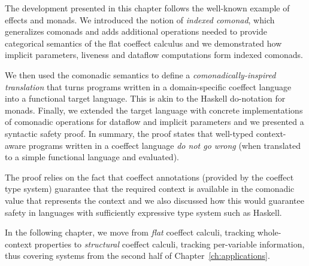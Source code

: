 The development presented in this chapter follows the well-known example of effects and monads.
We introduced the notion of \emph{indexed comonad}, which generalizes comonads
and adds additional operations needed to provide categorical semantics of the flat coeffect
calculus and we demonstrated how implicit parameters, liveness and dataflow computations form
indexed comonads.

We then used the comonadic semantics to define a \emph{comonadically-inspired translation}
that turns programs written in a domain-specific coeffect language into a functional target
language. This is akin to the Haskell do-notation for monads. Finally, we extended the target
language with concrete implementations of comonadic operations for dataflow and implicit parameters
and we presented a syntactic safety proof. In summary, the proof states that well-typed
context-aware programs written in a coeffect language \emph{do not go wrong} (when translated
to a simple functional language and evaluated).

The proof relies on the fact that coeffect annotations (provided by the coeffect type system)
guarantee that the required context is available in the comonadic value that represents the
context and we also discussed how this would guarantee safety in languages with sufficiently
expressive type system such as Haskell.

In the following chapter, we move from \emph{flat} coeffect calculi, tracking whole-context
properties to \emph{structural} coeffect calculi, tracking per-variable information, thus
covering systems from the second half of Chapter~\ref{ch:applications}.
